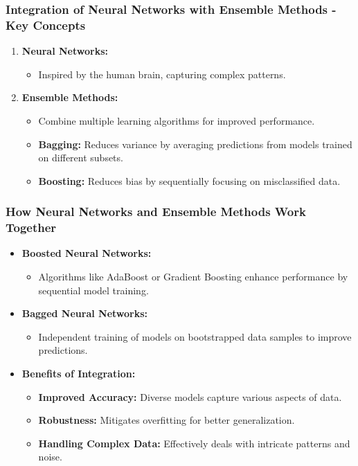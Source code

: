 \documentclass[aspectratio=169]{beamer}
\begin{document}
\begin{frame}[fragile]
    \frametitle{Integration of Neural Networks with Ensemble Methods - Key Concepts}
    \begin{enumerate}
        \item \textbf{Neural Networks:} 
            \begin{itemize}
                \item Inspired by the human brain, capturing complex patterns.
            \end{itemize}
        
        \item \textbf{Ensemble Methods:} 
            \begin{itemize}
                \item Combine multiple learning algorithms for improved performance.
                \item \textbf{Bagging:} Reduces variance by averaging predictions from models trained on different subsets.
                \item \textbf{Boosting:} Reduces bias by sequentially focusing on misclassified data.
            \end{itemize}
    \end{enumerate}
\end{frame}

\begin{frame}[fragile]
    \frametitle{How Neural Networks and Ensemble Methods Work Together}
    \begin{itemize}
        \item \textbf{Boosted Neural Networks:} 
            \begin{itemize}
                \item Algorithms like AdaBoost or Gradient Boosting enhance performance by sequential model training.
            \end{itemize}
        \item \textbf{Bagged Neural Networks:} 
            \begin{itemize}
                \item Independent training of models on bootstrapped data samples to improve predictions.
            \end{itemize}
        \item \textbf{Benefits of Integration:} 
            \begin{itemize}
                \item \textbf{Improved Accuracy:} Diverse models capture various aspects of data.
                \item \textbf{Robustness:} Mitigates overfitting for better generalization.
                \item \textbf{Handling Complex Data:} Effectively deals with intricate patterns and noise.
            \end{itemize}
    \end{itemize}
\end{frame}
\end{document}
